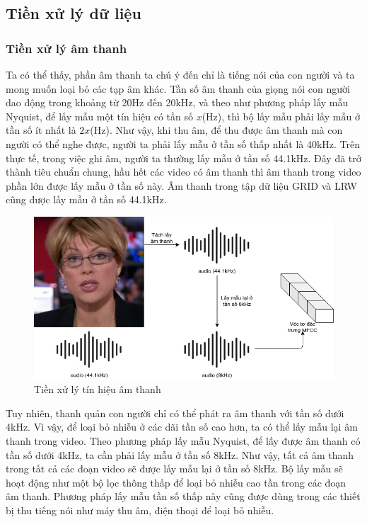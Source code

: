 \subsection{Tiền xử lý dữ liệu}

\subsubsection{Tiền xử lý âm thanh}
Ta có thể thấy, phần âm thanh ta chú ý đến chỉ là tiếng nói của con người và ta mong muốn loại bỏ các tạp âm khác. Tần số âm thanh của giọng nói con người dao động trong khoảng từ 20Hz đến 20kHz, và theo như phương pháp lấy mẫu Nyquist, để lấy mẫu một tín hiệu có tần số $x$(Hz), thì bộ lấy mẫu phải lấy mẫu ở tần số ít nhất là $2x$(Hz). Như vậy, khi thu âm, để thu được âm thanh mà con người có thể nghe được, người ta phải lấy mẫu ở tần số thấp nhất là 40kHz. Trên thực tế, trong việc ghi âm, người ta thường lấy mẫu ở tần số 44.1kHz. Đây đã trở thành tiêu chuẩn chung, hầu hết các video có âm thanh thì âm thanh trong video phần lớn được lấy mẫu ở tần số này. Âm thanh trong tập dữ liệu GRID và LRW cũng được lấy mẫu ở tần số 44.1kHz.

\begin{figure}[H]
    \centering
    \includegraphics[width=12cm]{./content/materials/preprocess-audio.png}
    \caption{Tiền xử lý tín hiệu âm thanh}
\end{figure}

Tuy nhiên, thanh quản con người chỉ có thể phát ra âm thanh với tần số dưới 4kHz. Vì vậy, để loại bỏ nhiễu ở các dãi tần số cao hơn, ta có thể lấy mẫu lại âm thanh trong video. Theo phương pháp lấy mẫu Nyquist, để lấy được âm thanh có tần số dưới 4kHz, ta cần phải lấy mẫu ở tần số 8kHz. Như vậy, tất cả âm thanh trong tất cả các đoạn video sẽ được lấy mẫu lại ở tần số 8kHz. Bộ lấy mẫu sẽ hoạt động như một bộ lọc thông thấp để loại bỏ nhiễu cao tần trong các đoạn âm thanh. Phương pháp lấy mẫu tần số thấp này cũng được dùng trong các thiết bị thu tiếng nói như máy thu âm, điện thoại để loại bỏ nhiễu.

